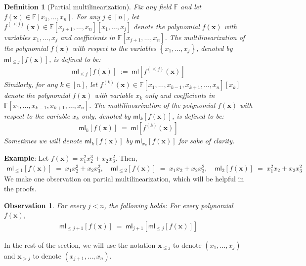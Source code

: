 \documentclass[11pt]{article}
\newtheorem{observation}[theorem]{Observation}
\newtheorem{definition}[theorem]{Definition}
\newcommand{\set}[1]{\left\{ #1 \right\}}
\newcommand{\F}{\mathbb{F}}
\newcommand{\ml}{\mathsf{ml}}
\begin{document}
 \begin{definition}[Partial multilinearization]
Fix any field $\F$ and let $f(\mathbf{x}) \in \F[x_{1},\ldots,x_{n}]$. For any $j \in [n]$, let $f^{(\leq j)}(\mathbf{x}) \in \F[x_{j+1},\ldots,x_{n}][x_{1},\ldots,x_{j}]$ denote the polynomial $f(\mathbf{x})$ with variables $x_{1},\ldots,x_{j}$ and coefficients in $\F[x_{j+1},\ldots,x_{n}]$.\newline
The multilinearization of the polynomial $f(\mathbf{x})$ with respect to the variables $\set{x_{1},\ldots,x_{j}}$, denoted by $\ml_{\leq j}[f(\mathbf{x})]$, is defined to be:
\begin{align*}
    \ml_{\leq j}[f(\mathbf{x})] \; := \; \ml[f^{(\leq j)}(\mathbf{x})]
\end{align*}
Similarly, for any $k \in [n]$, let $f^{(k)}(\mathbf{x}) \in \F[x_{1},\ldots,x_{k-1},x_{k+1},\ldots,x_{n}][x_{k}]$ denote the polynomial $f(\mathbf{x})$ with variable $x_{k}$ only and coefficients in $\F[x_{1},\ldots,x_{k-1},x_{k+1},\ldots,x_{n}]$. The multilinearization of the polynomial $f(\mathbf{x})$ with respect to the variable $x_{k}$ only, denoted by $\ml_{k}[f(\mathbf{x})]$, is defined to be:
\begin{align*}
    \ml_{k}[f(\mathbf{x})] \; = \; \ml[f^{(k)}(\mathbf{x})]
\end{align*}
Sometimes we will denote $\ml_{k}[f(\mathbf{x})]$ by $\ml_{x_{k}}[f(\mathbf{x})]$ for sake of clarity.
\end{definition}
\noindent
\textbf{Example}: Let $f(\mathbf{x}) = x_{1}^{2} x_{2}^{3} + x_{2} x_{3}^{2}$. Then,
\begin{align*}
    \ml_{\leq 1}[f(\mathbf{x})] \; = \; x_{1}x_{2}^{3} + x_{2}x_{3}^{2}, \quad \ml_{\leq 2}[f(\mathbf{x})] \; = \; x_{1}x_{2} + x_{2}x_{3}^{2}, \quad
    \ml_{2}[f(\mathbf{x})] \; = \; x_{1}^{2}x_{2} + x_{2}x_{3}^{2}
\end{align*}
\noindent
We make one observation on partial multilinearization, which will be helpful in the proofs.
\begin{observation}\label{obs:partial-ml-sequence}
For every $j < n$, the following holds: For every polynomial $f(\mathbf{x})$,
\begin{align*}
    \ml_{\leq j+1}[f(\mathbf{x})] \; = \; \ml_{j+1}[\ml_{\leq j}[f(\mathbf{x})]]
\end{align*}
\end{observation}
\noindent
In the rest of the section, we will use the notation $\mathbf{x}_{\leq j}$ to denote $(x_{1},\ldots,x_{j})$ and $\mathbf{x}_{>j}$ to denote $(x_{j+1},\ldots,x_{n})$. 
\end{document}
